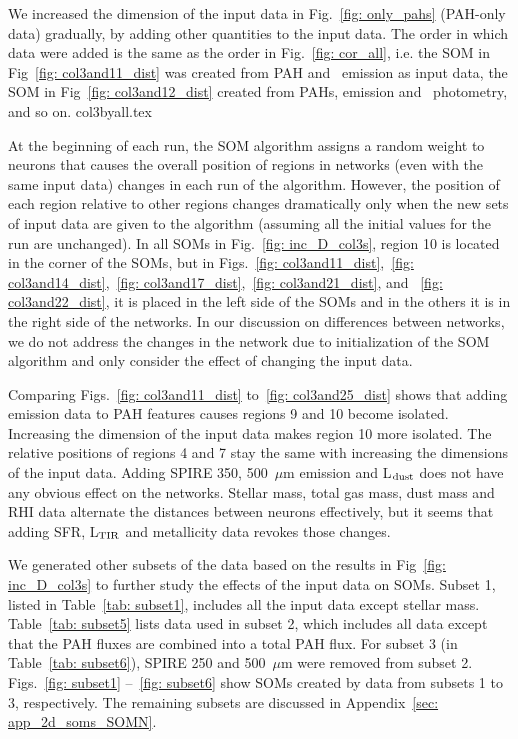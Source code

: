             We increased the dimension of the input data in Fig.~\ref{fig: only_pahs} (PAH-only data) gradually, by adding other quantities to the input data. 
            The order in which data were added is the same as the order in Fig.~\ref{fig: cor_all}, i.e. the SOM in Fig~\ref{fig: col3and11_dist} was created from PAH and \halpha\ emission as input data, the SOM in Fig~\ref{fig: col3and12_dist} created from PAHs, \halpha emission and \sii~photometry, and so on. 
            {col3byall.tex}
            
            At the beginning of each run, the SOM algorithm assigns a random weight to neurons that causes the overall position of regions in networks (even with the same input data) changes in each run of the algorithm.
            However, the position of each region relative to other regions changes dramatically only when the new sets of input data are given to the algorithm (assuming all the initial values for the run are unchanged).
            In all SOMs in Fig.~\ref{fig: inc_D_col3s}, region 10 is located in the corner of the SOMs, but in Figs.~\ref{fig: col3and11_dist},~\ref{fig: col3and14_dist},~\ref{fig: col3and17_dist},~\ref{fig: col3and21_dist}, and ~\ref{fig: col3and22_dist}, it is placed in the left side of the SOMs and in the others it is in the right side of the networks.
            In our discussion on differences between networks, we do not address the changes in the network due to initialization of the SOM algorithm and only consider the effect of changing the input data.
            
            Comparing Figs.~\ref{fig: col3and11_dist} to~\ref{fig: col3and25_dist} shows that adding \halpha emission data to PAH features causes regions 9 and 10 become isolated. 
            Increasing the dimension of the input data makes region 10 more isolated.
            The relative positions of regions 4 and 7 stay the same with increasing the dimensions of the input data. 
            Adding SPIRE 350, 500~$\mu$m emission and L$_{\rm dust}$ does not have any obvious effect on the networks.
            Stellar mass, total gas mass, dust mass and RHI data alternate the distances between neurons effectively, but it seems that adding SFR, L$_{\rm TIR}$ and metallicity data revokes those changes.
            
            We generated other subsets of the data based on the results in Fig~\ref{fig: inc_D_col3s} to further study the effects of the input data on SOMs.
            Subset 1, listed in Table~\ref{tab: subset1}, includes all the input data except stellar mass.
            Table~\ref{tab: subset5} lists data used in subset 2, which includes all data except that the PAH fluxes are combined into a total PAH flux. 
            For subset 3 (in Table~\ref{tab: subset6}), SPIRE 250 and 500~$\mu$m were removed from subset 2.
            Figs.~\ref{fig: subset1} --~\ref{fig: subset6} show SOMs created by data from subsets 1 to 3, respectively.
            The remaining subsets are discussed in Appendix~\ref{sec: app_2d_soms_SOMN}.

